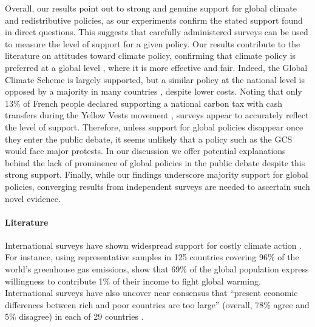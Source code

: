 Overall, our results %
point out to strong and genuine support for global climate and redistributive policies, as our experiments confirm the stated support found in direct questions. This suggests that carefully administered surveys can be used to measure the level of support for a given policy. Our results contribute to the literature on attitudes toward climate policy, confirming that climate policy is preferred at a global level \citep{issp_international_2010,beiser-mcgrath_could_2019,sivonen_attitudes_2022,meilland_international_2023}, where it is more effective and fair. Indeed, the Global Climate Scheme is largely supported, but a similar policy at the national level is opposed by a majority in many countries \citep{dechezlepretre_fighting_2022}, despite lower costs. Noting that only 13\% of French people declared supporting a national carbon tax with cash transfers during the Yellow Vests movement \citep{douenne_yellow_2022}, surveys appear to accurately reflect the level of support. Therefore, unless support for global policies disappear once they enter the public debate, it seems unlikely that a policy such as the GCS would face major protests. 
In our discussion we offer potential explanations behind the lack of prominence of global policies in the public debate despite this strong support. 
Finally, while our findings underscore majority support for global policies, converging results from independent surveys are needed to ascertain such novel evidence. %
\paragraph{Literature} 

International surveys have shown widespread support for costly climate action \citep{dechezlepretre_fighting_2022,leiserowitz_international_2022}. For instance, using representative samples in 125 countries covering 96\% of the world's greenhouse gas emissions, \citet{andre_globally_2024} show that 69\% of the global population express willingness to contribute 1\% of their income to fight global warming. International surveys have also uncover near consensus that ``present economic differences between rich and poor countries are too large'' (overall, 78\% agree and 5\% disagree) in each of 29 countries \citep{issp_international_2019}. 

